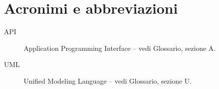\cleardoublepage
\chapter*{Acronimi e abbreviazioni}


\begin{description}
\item[API] Application Programming Interface -- vedi Glossario, sezione A.
\item[UML] Unified Modeling Language -- vedi Glossario, sezione U.
\end{description}